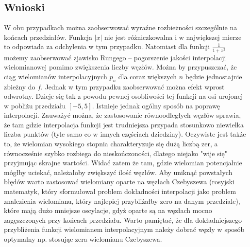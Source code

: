 \documentclass[11pt]{mk-polish-lab-report}
\begin{document}
\subsection{Wnioski}
W obu przypadkach można zaobserwować wyraźne rozbieżności szczególnie na końcach przedziałów. Funkcja $|x|$ nie jest różniczkowalna i w największej mierze to odpowiada za odchylenia w tym przypadku. Natomiast dla funkcji $\frac{1}{1+x^2}$ możemy zaobserwować zjawisko Rungego -- pogorszenie jakości interpolacji wielomianowej pomimo zwiększenia liczby węzłów. Można by przypuszczać, że ciąg wielomianów interpolacyjnych ${p_n}$ dla coraz większych $n$ będzie jednostajnie zbieżny do $f$. Jednak w tym przypadku zaobserwować można efekt wprost odwrotny. Dzieje się tak z powodu pewnej osobliwości tej funkcji na osi urojonej w pobliżu przedziału $[-5, 5]$. Istnieje jednak ogólny sposób na poprawę interpolacji. Zauważyć można, że zastosowanie równoodległych węzłów sprawia, że tam gdzie interpolacja funkcji jest trudniejsza przypada stosunkowo niewielka liczba punktów (tyle samo co w innych częściach dziedziny). Oczywiste jest także to, że wielomian wysokiego stopnia charakteryzuje się dużą liczbą zer, a równocześnie szybko rozbiega do nieskończoności, dlatego niejako "wije się" przyjmując skrajne wartości. Widać zatem że tam, gdzie wielomian potencjalnie mógłby uciekać, należałoby zwiększyć ilość węzłów. Aby uniknąć powstałych błędów warto zastosować wielomiany oparte na węzłach Czebyszewa (rosyjski matematyk, który sformułował problem dokładności interpolacji jako problem znalezienia wielomianu, który najlepiej przybliżałby zero na danym przedziale), które mają dużo mniejsze oscylacje, gdyż oparte są na węzłach mocno zagęszczonych przy końcach przedziału. Warto pamiętać, że dla dokładniejszego przybliżenia funkcji wielomianem interpolacyjnym należy dobrać węzły w sposób optymalny np. stosując zera wielomianu Czebyszewa.
\end{document}
